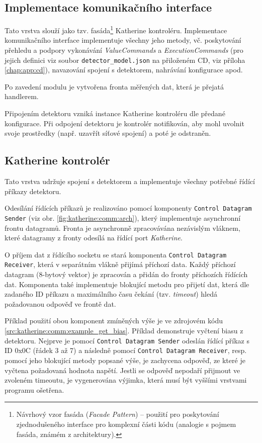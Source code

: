 \subsection{Implementace komunikačního interface}
Tato vrstva slouží jako tzv. fasáda\footnote{Návrhový vzor fasáda (\textit{Facade Pattern}) -- použití pro poskytování zjednodušeného interface pro komplexní části kódu (analogie s pojmem fasáda, známém z architektury).} Katherine kontroléru. Implementace komunikačního interface implementuje všechny jeho metody, vč. poskytování přehledu a podpory vykonávání \textit{ValueCommands} a \textit{ExecutionCommands} (pro jejich definici viz soubor \texttt{detector\_model.json} na přiloženém CD, viz příloha \ref{chap:app:cd}), navazování spojení s detektorem, nahrávání konfigurace apod.

Po zavedení modulu je vytvořena fronta měřených dat, která je přejatá handlerem.

Připojením detektoru vzniká instance Katherine kontroléru dle předané konfigurace. Při odpojení detektoru je kontrolér notifikován, aby mohl uvolnit svoje prostředky (např. uzavřít síťové spojení) a poté je odstraněn.

\subsection{Katherine kontrolér}
Tato vrstva udržuje spojení s detektorem a implementuje všechny potřebné řídící příkazy detektoru.

Odesílání řídících příkazů je realizováno pomocí komponenty \texttt{Control Datagram Sender} (viz obr. \ref{fig:katherine:comm:arch}), který implementuje asynchronní frontu datagramů. Fronta je asynchronně zpracovávána nezávislým vláknem, které datagramy z fronty odesílá na řídící port \textit{Katherine}.

O příjem dat z řídícího socketu se stará komponenta \texttt{Control Datagram Receiver}, která v separátním vlákně přijímá příchozí data. Každý příchozí datagram (8-bytový vektor) je zpracován a přidán do fronty příchozích řídících dat. Komponenta také implementuje blokující metodu pro přijetí dat, která dle zadaného ID příkazu a maximálního času čekání (tzv. \textit{timeout}) hledá požadovanou odpověď ve frontě dat.

Příklad použití obou komponent zmíněných výše je ve zdrojovém kódu \ref{src:katherine:comm:example_get_bias}. Příklad demonstruje vyčtení biasu z detektoru. Nejprve je pomocí \texttt{Control Datagram Sender} odeslán řídící příkaz s ID 0x0C (řádek 3 až 7) a následně pomocí \texttt{Control Datagram Receiver}, resp. pomocí jeho blokující metody popsané výše, je zachycena odpověď, ze které je vyčtena požadovaná hodnota napětí. Jestli se odpověď nepodaří přijmout ve zvoleném timeoutu, je vygenerována výjimka, která musí být vyššími vrstvami programu ošetřena.

